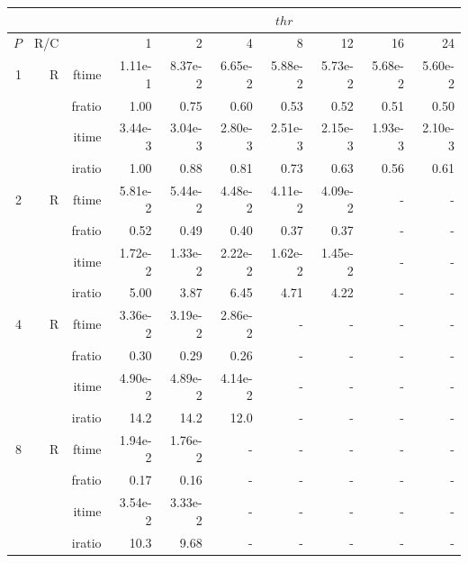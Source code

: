 \documentclass[a4paper]{article}
\begin{document}
\begin{table}[htbp]
\begin{center}
\begin{small}
\begin{tabular}{|r|r|r|r|r|r|r|r|r|r|}
\hline 
     & & & \multicolumn{7}{c|}{$thr$} \\ \hline
    $P$ & R/C &  & 1           & 2    & 4    & 8    & 12   & 16    & 24  \\ \hline\hline
   1 &   R &   ftime &    1.11e-1 &    8.37e-2 &    6.65e-2 &    5.88e-2 &    5.73e-2 &    5.68e-2 &    5.60e-2 \\
            &            &  fratio &    1.00 &    0.75 &    0.60 &    0.53 &    0.52 &    0.51 &    0.50 \\
            &            &  itime &    3.44e-3 &    3.04e-3 &    2.80e-3 &    2.51e-3 &    2.15e-3 &    1.93e-3 &    2.10e-3 \\
            &            &  iratio &    1.00 &    0.88 &    0.81 &    0.73 &    0.63 &    0.56 &    0.61 \\\hline
   2 &   R &   ftime &    5.81e-2 &    5.44e-2 &    4.48e-2 &    4.11e-2 &    4.09e-2 &   - &   - \\
            &            &  fratio &    0.52 &    0.49 &    0.40 &    0.37 &    0.37 &   - &   - \\
            &            &  itime &    1.72e-2 &    1.33e-2 &    2.22e-2 &    1.62e-2 &    1.45e-2 &   - &   - \\
            &            &  iratio &    5.00 &    3.87 &    6.45 &    4.71 &    4.22 &   - &   - \\\hline
   4 &   R &   ftime &    3.36e-2 &    3.19e-2 &    2.86e-2 &   - &   - &   - &   - \\
            &            &  fratio &    0.30 &    0.29 &    0.26 &   - &   - &   - &   - \\
            &            &  itime &    4.90e-2 &    4.89e-2 &    4.14e-2 &   - &   - &   - &   - \\
            &            &  iratio &    14.2 &  14.2 &  12.0 & - &   - &   - &   - \\\hline
   8 &   R &   ftime &    1.94e-2 &    1.76e-2 &   - &   - &   - &   - &   - \\
            &            &  fratio &    0.17 &    0.16 &   - &   - &   - &   - &   - \\
            &            &  itime &    3.54e-2 &    3.33e-2 &   - &   - &   - &   - &   - \\
            &            &  iratio &    10.3 &   9.68 &   - &   - &   - &   - &   - \\\hline

\end{tabular}
\end{small}
\end{center}
\end{table}
\end{document}
